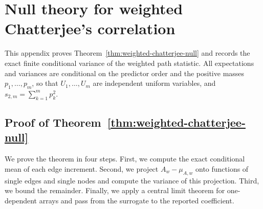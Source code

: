 \section{Null theory for weighted Chatterjee's correlation}
\label{app:chatterjee-null-moments}

This appendix proves Theorem~\ref{thm:weighted-chatterjee-null} and records
the exact finite conditional variance of the weighted path statistic. All
expectations and variances are conditional on the predictor order and the
positive masses $p_1,\ldots,p_m$, so that $U_1,\ldots,U_m$ are independent
uniform variables, and $s_{2,m}=\sum_{k=1}^m p_k^2$.

\subsection{Proof of Theorem~\ref{thm:weighted-chatterjee-null}}

We prove the theorem in four steps. First, we compute the exact conditional
mean of each edge increment. Second, we project $A_w-\mu_{A,w}$ onto
functions of single edges and single nodes and compute the variance of this
projection. Third, we bound the remainder. Finally, we apply a central limit
theorem for one-dependent arrays and pass from the surrogate to the reported
coefficient.

